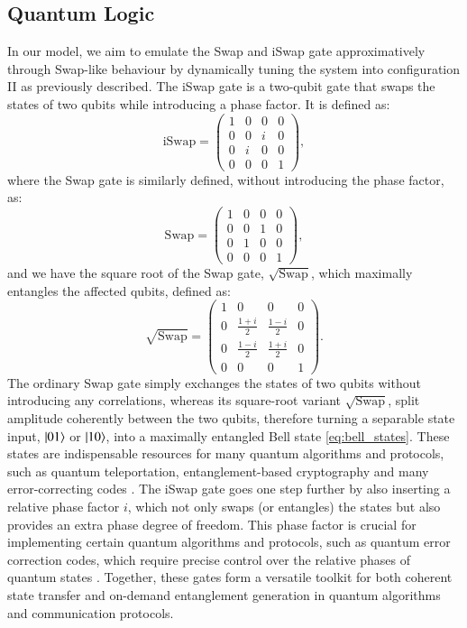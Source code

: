 \documentclass{subfiles}
\begin{document}
\subsection{Quantum Logic}
In our model, we aim to emulate the Swap and iSwap gate approximatively through Swap-like behaviour by dynamically tuning the system into configuration II as previously described. The iSwap gate is a two-qubit gate that swaps the states of two qubits while introducing a phase factor. It is defined as:
\begin{equation}
    \text{iSwap} = \begin{pmatrix}
    1 & 0 & 0 & 0 \\
    0 & 0 & i & 0 \\
    0 & i & 0 & 0 \\
    0 & 0 & 0 & 1
    \end{pmatrix} \label{eq:iswap_gate},
\end{equation}
where the Swap gate is similarly defined, without introducing the phase factor, as:
\begin{equation}
    \text{Swap} = \begin{pmatrix}
    1 & 0 & 0 & 0 \\
    0 & 0 & 1 & 0 \\
    0 & 1 & 0 & 0 \\
    0 & 0 & 0 & 1
    \end{pmatrix} \label{eq:swap_gate},
\end{equation}
and we have the square root of the Swap gate, $\sqrt{\text{Swap}}$, which maximally entangles the affected qubits, defined as:
\begin{equation}
    \sqrt{\text{Swap}} = \begin{pmatrix}
    1 & 0 & 0 & 0 \\
    0 & \frac{1+i}{2} & \frac{1-i}{2} & 0 \\
    0 & \frac{1-i}{2} & \frac{1+i}{2} & 0 \\
    0 & 0 & 0 & 1
    \end{pmatrix} \label{eq:sqrt_swap_gate}.
\end{equation}
The ordinary Swap gate simply exchanges the states of two qubits without introducing any correlations, whereas its square-root variant $\sqrt{\text{Swap}}$, split amplitude coherently between the two qubits, therefore turning a separable state input, $\ket{01}$ or $\ket{10}$, into a maximally entangled Bell state \eqref{eq:bell_states}. These states are indispensable resources for many quantum algorithms and protocols, such as quantum teleportation, entanglement-based cryptography and many error-correcting codes \cite{nielsen2010quantum, bouwmeester1997experimental, yin2020entanglement}. The iSwap gate goes one step further by also inserting a relative phase factor $i$, which not only swaps (or entangles) the states but also provides an extra phase degree of freedom. This phase factor is crucial for implementing certain quantum algorithms and protocols, such as quantum error correction codes, which require precise control over the relative phases of quantum states \cite{tanamoto2008efficient, shor1996fault}. Together, these gates form a versatile toolkit for both coherent state transfer and on-demand entanglement generation in quantum algorithms and communication protocols. 
\end{document}
